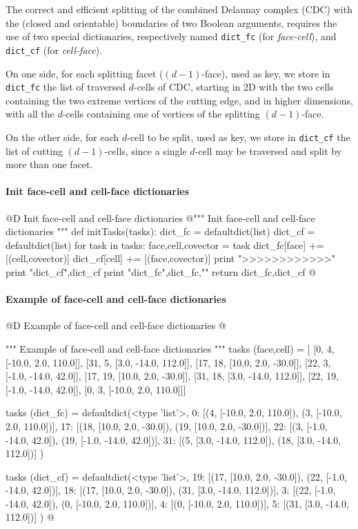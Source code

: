 \documentclass[11pt,oneside]{article}	%
\begin{document}
The correct and efficient splitting of the combined Delaunay complex (CDC) with the  (closed and orientable) boundaries of two Boolean arguments, requires the use of two special dictionaries, respectively named \texttt{dict\_fc} (for \emph{face-cell}), and \texttt{dict\_cf} (for \emph{cell-face}).
 
On one side, for each splitting facet ($(d-1)$-face), used as key, we store in \texttt{dict\_fc} the list of traversed $d$-cells of CDC, starting in 2D with the two cells containing the two extreme vertices of the cutting edge, and in higher dimensions, with all the $d$-cells containing one of vertices of the splitting $(d-1)$-face.

On the other side, for each $d$-cell to be split, used as key, we store in \texttt{dict\_cf} the list of cutting $(d-1)$-cells, since a single $d$-cell may be traversed and split by more than one facet. 


\paragraph{Init face-cell and cell-face dictionaries}

@D Init face-cell and cell-face dictionaries
@{""" Init face-cell and cell-face dictionaries """
def initTasks(tasks):
	dict_fc = defaultdict(list)
	dict_cf = defaultdict(list)
	for task in tasks:
		face,cell,covector = task
		dict_fc[face] += [(cell,covector)] 
		dict_cf[cell] += [(face,covector)] 
		print "\n>>>>>>>>>>>>"
		print "dict_cf",dict_cf
		print "dict_fc",dict_fc,"\n"
	return dict_fc,dict_cf
@}

\paragraph{Example of face-cell and cell-face dictionaries}

@D Example of face-cell and cell-face dictionaries
@{""" Example of face-cell and cell-face dictionaries """
tasks (face,cell) = [
 [0, 4, [-10.0, 2.0, 110.0]],
 [31, 5, [3.0, -14.0, 112.0]],
 [17, 18, [10.0, 2.0, -30.0]],
 [22, 3, [-1.0, -14.0, 42.0]],
 [17, 19, [10.0, 2.0, -30.0]],
 [31, 18, [3.0, -14.0, 112.0]],
 [22, 19, [-1.0, -14.0, 42.0]],
 [0, 3, [-10.0, 2.0, 110.0]]]

tasks (dict_fc) = defaultdict(<type 'list'>, {
  0: [(4, [-10.0, 2.0, 110.0]), (3, [-10.0, 2.0, 110.0])],
 17: [(18, [10.0, 2.0, -30.0]), (19, [10.0, 2.0, -30.0])],
 22: [(3, [-1.0, -14.0, 42.0]), (19, [-1.0, -14.0, 42.0])],
 31: [(5, [3.0, -14.0, 112.0]), (18, [3.0, -14.0, 112.0])]  })

tasks (dict_cf) = defaultdict(<type 'list'>, {
 19: [(17, [10.0, 2.0, -30.0]), (22, [-1.0, -14.0, 42.0])],
 18: [(17, [10.0, 2.0, -30.0]), (31, [3.0, -14.0, 112.0])],
  3: [(22, [-1.0, -14.0, 42.0]), (0, [-10.0, 2.0, 110.0])],
  4: [(0, [-10.0, 2.0, 110.0])],
  5: [(31, [3.0, -14.0, 112.0])]  })
@}
\end{document}
